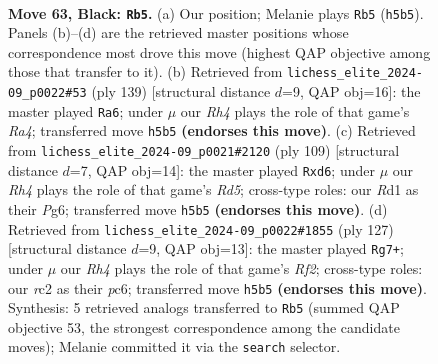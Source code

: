 \documentclass[11pt]{article}
\begin{document}
\clearpage

\begin{figure}[p]\centering
\begin{subfigure}{0.46\textwidth}\centering
\resizebox{\linewidth}{!}{%
\newchessgame
\chessboard[
  setfen={8/6k1/8/p6r/5K2/1P6/2R4P/3r4 b - - 1 63},
  showmover=false,
  pgfstyle=straightmove, color=movearrow, markmove={h5-b5}
]}
\caption{}
\end{subfigure}\hfill
\begin{subfigure}{0.46\textwidth}\centering
\resizebox{\linewidth}{!}{%
\newchessgame
\chessboard[
  setfen={8/P3R3/8/r1p5/8/1K6/8/2k5 b - - 6 70},
  showmover=false,
  pgfstyle=straightmove, color=movearrow, markmove={a5-a6}
]}
\caption{}
\end{subfigure}
\\[4pt]
\begin{subfigure}{0.46\textwidth}\centering
\resizebox{\linewidth}{!}{%
\newchessgame
\chessboard[
  setfen={5k2/8/3P2p1/1R4P1/3r3p/8/7K/8 b - - 0 55},
  showmover=false,
  pgfstyle=straightmove, color=movearrow, markmove={d4-d6}
]}
\caption{}
\end{subfigure}\hfill
\begin{subfigure}{0.46\textwidth}\centering
\resizebox{\linewidth}{!}{%
\newchessgame
\chessboard[
  setfen={8/p4r2/2PR4/P7/4k3/8/5PK1/8 b - - 2 64},
  showmover=false,
  pgfstyle=straightmove, color=movearrow, markmove={f7-g7}
]}
\caption{}
\end{subfigure}
\caption{\textbf{Move 63, Black: \texttt{Rb5}.} (a) Our position; Melanie plays \texttt{Rb5} (\texttt{h5b5}). Panels (b)--(d) are the retrieved master positions whose correspondence most drove this move (highest QAP objective among those that transfer to it). (b) Retrieved from \texttt{lichess\_elite\_2024-09\_p0022\#53} (ply 139) [structural distance $d$=9, QAP obj=16]: the master played \texttt{Ra6}; under $\mu$ our \emph{Rh4} plays the role of that game's \emph{Ra4}; transferred move \texttt{h5b5} \textbf{(endorses this move)}. (c) Retrieved from \texttt{lichess\_elite\_2024-09\_p0021\#2120} (ply 109) [structural distance $d$=7, QAP obj=14]: the master played \texttt{Rxd6}; under $\mu$ our \emph{Rh4} plays the role of that game's \emph{Rd5}; cross-type roles: our \emph{R}d1 as their \emph{P}g6; transferred move \texttt{h5b5} \textbf{(endorses this move)}. (d) Retrieved from \texttt{lichess\_elite\_2024-09\_p0022\#1855} (ply 127) [structural distance $d$=9, QAP obj=13]: the master played \texttt{Rg7+}; under $\mu$ our \emph{Rh4} plays the role of that game's \emph{Rf2}; cross-type roles: our \emph{r}c2 as their \emph{p}c6; transferred move \texttt{h5b5} \textbf{(endorses this move)}. Synthesis: 5 retrieved analogs transferred to \texttt{Rb5} (summed QAP objective 53, the strongest correspondence among the candidate moves); Melanie committed it via the \texttt{search} selector.}
\label{fig:thought-m125}
\end{figure}
\end{document}
